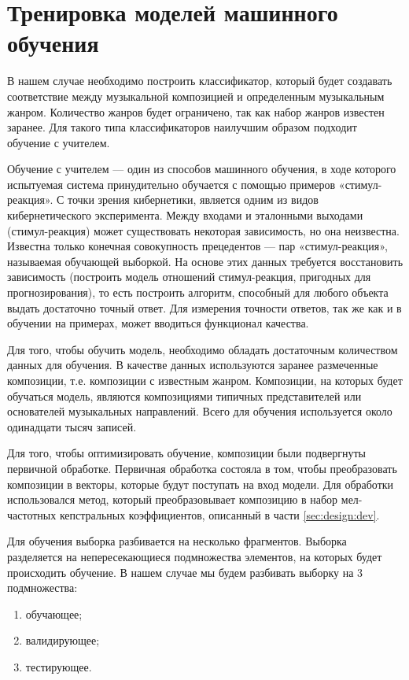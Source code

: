 \section{Тренировка моделей машинного обучения}
\label{sec:training}

В нашем случае необходимо построить классификатор, который будет создавать соответствие между музыкальной композицией и определенным музыкальным жанром. Количество жанров будет ограничено, так как набор жанров известен заранее. Для такого типа классификаторов наилучшим образом подходит обучение с учителем.

Обучение с учителем — один из способов машинного обучения, в ходе которого испытуемая система принудительно обучается с помощью примеров «стимул-реакция». С точки зрения кибернетики, является одним из видов кибернетического эксперимента. Между входами и эталонными выходами (стимул-реакция) может существовать некоторая зависимость, но она неизвестна. Известна только конечная совокупность прецедентов — пар «стимул-реакция», называемая обучающей выборкой. На основе этих данных требуется восстановить зависимость (построить модель отношений стимул-реакция, пригодных для прогнозирования), то есть построить алгоритм, способный для любого объекта выдать достаточно точный ответ. Для измерения точности ответов, так же как и в обучении на примерах, может вводиться функционал качества.

Для того, чтобы обучить модель, необходимо обладать достаточным количеством данных для обучения. В качестве данных используются заранее размеченные композиции, т.е. композиции с известным жанром. Композиции, на которых будет обучаться модель, являются композициями типичных представителей или основателей музыкальных направлений. Всего для обучения используется около одинадцати тысяч записей.

Для того, чтобы оптимизировать обучение, композиции были подвергнуты первичной обработке. Первичная обработка состояла в том, чтобы преобразовать композиции в векторы, которые будут поступать на вход модели. Для обработки использовался метод, который преобразовывает композицию в набор мел-частотных кепстральных коэффициентов, описанный в части \ref{sec:design:dev}.

Для обучения выборка разбивается на несколько фрагментов. Выборка разделяется на непересекающиеся подмножества элементов, на которых будет происходить обучение. В нашем случае мы будем разбивать выборку на 3 подмножества:
\begin{enumerate}
  \item обучающее;
  \item валидирующее;
  \item тестирующее.
\end{enumerate}

